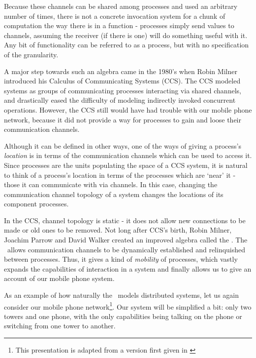 Because these channels can be shared among processes and used an arbitrary number of times, there is not a concrete invocation system for a chunk of computation the way there is in a function - processes simply send values to channels, assuming the receiver (if there is one) will do something useful with it.  Any bit of functionality can be referred to as a process, but with no specification of the granularity.

A major step towards such an algebra came in the 1980's when Robin Milner introduced his Calculus of Communicating Systems (CCS).   The CCS modeled systems as groups of communicating processes interacting via shared channels, and drastically eased the difficulty of modeling indirectly invoked concurrent operations.  However, the CCS still would have had trouble with our mobile phone network, because it did not provide a way for processes to gain and loose their communication channels.

	Although it can be defined in other ways, one of the ways of giving a process's \emph{location} is in terms of the communication channels which can be used to access it.  Since processes are the units populating the space of a CCS system, it is natural to think of a process's location in terms of the processes which are `near' it - those it can communicate with via channels.  In this case, changing the communication channel topology of a system changes the locations of its component processes.  
	
	In the CCS, channel topology is static - it does not allow new connections to be made or old ones to be removed.  Not long after CCS's birth, Robin Milner, Joachim Parrow and David Walker created an improved algebra called the \picalc.  The \picalc\ allows communication channels to be dynamically established and relinquished between processes.  Thus, it gives a kind of \emph{mobility} of processes, which vastly expands the capabilities of interaction in a system and finally allows us to give an account of our mobile phone system.
	
	As an example of how naturally the \picalc\ models distributed systems, let us again consider our mobile phone network\footnote{This presentation is adapted from a version first given in \cite{miln99}}.    Our system will be simplified a bit: only two towers and one phone, with the only capabilities being talking on the phone or switching from one tower to another.
	
